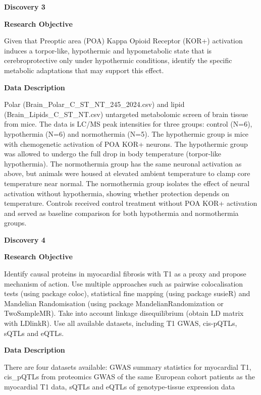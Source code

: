 \documentclass{article}
\begin{document}
\noindent \textbf{Discovery 3} \par
\noindent \textbf{Research Objective} \par
Given that Preoptic area (POA) Kappa Opioid Receptor (KOR+) activation induces a torpor-like, hypothermic and hypometabolic state that is  cerebroprotective only under hypothermic conditions, identify the specific metabolic adaptations that may support this effect. \par
\noindent \textbf{Data Description} \par
Polar (Brain\_Polar\_C\_ST\_NT\_245\_2024.csv) and lipid (Brain\_Lipids\_C\_ST\_NT.csv) untargeted metabolomic screen of brain tissue from mice.  The data is LC/MS peak intensities for three groups: control (N=6), hypothermia (N=6) and normothermia (N=5). The hypothermic group is mice with chemogenetic activation of POA KOR+ neurons. The hypothermic group was allowed to undergo the full drop in body temperature (torpor-like hypothermia).  The normothermia group has the same neuronal activation as above, but animals were housed at elevated ambient temperature to clamp core temperature near normal.  The normothermia group isolates the effect of neural activation without hypothermia, showing whether protection depends on temperature.  Controls received control treatment without POA KOR+ activation and served as baseline comparison for both hypothermia and normothermia groups. \par

\vspace{1em}

\noindent \textbf{Discovery 4} \par
\noindent \textbf{Research Objective} \par
Identify causal proteins in myocardial fibrosis with T1 as a proxy and propose mechanism of action. Use multiple approaches such as pairwise colocalisation tests (using package coloc), statistical fine mapping (using package susieR) and Mandelian Randomisation (using package MandelianRandomization or TwoSampleMR). Take into account linkage disequilibrium (obtain LD matrix with LDlinkR). Use all available datasets, including T1 GWAS, cis-pQTLs, sQTLs and eQTLs. \par
\noindent \textbf{Data Description} \par
There are four datasets available: GWAS summary statistics for myocardial T1, cis\_pQTLs from proteomics GWAS of the same European cohort patients as the myocardial T1 data, sQTLs and eQTLs of genotype-tissue expression data \par
\end{document}
